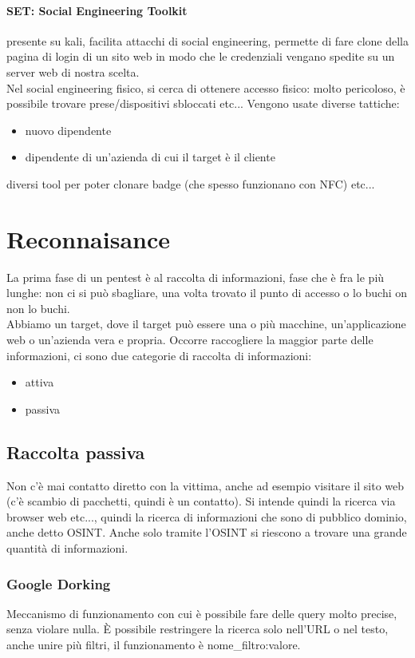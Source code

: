 \documentclass{article}
\begin{document}
\paragraph{SET: Social Engineering Toolkit}presente su kali, facilita attacchi di social engineering, permette di fare clone della pagina di login di un sito web in modo che le credenziali vengano spedite su un server web di nostra scelta.\\ Nel social engineering fisico, si cerca di ottenere accesso fisico: molto pericoloso, è possibile trovare prese/dispositivi sbloccati etc... Vengono usate diverse tattiche:
\begin{itemize}
\item nuovo dipendente
\item dipendente di un'azienda di cui il target è il cliente
\end{itemize}
diversi tool per poter clonare badge (che spesso funzionano con NFC) etc...
\section{Reconnaisance}
La prima fase di un pentest è al raccolta di informazioni, fase che è fra le più lunghe: non ci si può sbagliare, una volta trovato il punto di accesso o lo buchi on non lo buchi.\\ Abbiamo un target, dove il target può essere una o più macchine, un'applicazione web o un'azienda vera e propria. Occorre raccogliere la maggior parte delle informazioni, ci sono due categorie di raccolta di informazioni:
\begin{itemize}
\item attiva
\item passiva
\end{itemize}
\subsection{Raccolta passiva}
Non c'è mai contatto diretto con la vittima, anche ad esempio visitare il sito web (c'è scambio di pacchetti, quindi è un contatto). Si intende quindi la ricerca via browser web etc..., quindi la ricerca di informazioni che sono di pubblico dominio, anche detto OSINT. Anche solo tramite l'OSINT si riescono a trovare una grande quantità di informazioni.
\subsubsection{Google Dorking}
Meccanismo di funzionamento con cui è possibile fare delle query molto precise, senza violare nulla. È possibile restringere la ricerca solo nell'URL o nel testo, anche unire più filtri, il funzionamento è \textsf{nome\_filtro:valore}.
\end{document}
